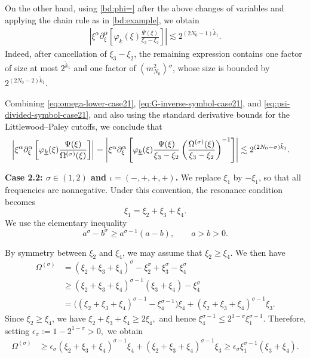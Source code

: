 \documentclass[UTF-8,reqno]{amsart}
\numberwithin{equation}{section}
\theoremstyle{definition}
\def\geq{\geqslant}
\def\leq{\leqslant}
\def\geq{\geqslant}
\def\leq{\leqslant}
\begin{document}
On the other hand, using \eqref{bd:phi=} after the above changes of
variables and applying the chain rule as in \eqref{bd:example}, we
obtain
\begin{align}
\left|
\xi^\alpha\partial_\xi^\alpha
\left[
\varphi_{\underline{k}}(\xi)
\frac{\Psi(\xi)}{\xi_3-\xi_2}
\right]
\right|
\lesssim
2^{(2N_0-1)\tilde{k}_1}.
\label{eq:psi-divided-symbol-case21}
\end{align}
Indeed, after cancellation of $\xi_3-\xi_2$, the remaining expression
contains one factor of size at most $2^{\tilde{k}_1}$ and one factor
of $(m_{N_0}^2)''$, whose size is bounded by
$2^{(2N_0-2)\tilde{k}_1}$.

Combining \eqref{eq:omega-lower-case21},
\eqref{eq:G-inverse-symbol-case21}, and
\eqref{eq:psi-divided-symbol-case21}, and also using the standard
derivative bounds for the Littlewood--Paley cutoffs, we conclude that
\begin{align}
\left|
\xi^\alpha\partial_\xi^\alpha
\left[
\varphi_{\underline{k}}(\xi)
\frac{\Psi(\xi)}{\Omega^{(\sigma)}(\xi)}
\right]
\right|
&=
\left|
\xi^\alpha\partial_\xi^\alpha
\left[
\varphi_{\underline{k}}(\xi)
\frac{\Psi(\xi)}{\xi_3-\xi_2}
\left(
\frac{\Omega^{(\sigma)}(\xi)}
     {\xi_3-\xi_2}
\right)^{-1}
\right]
\right| \lesssim
2^{(2N_0-\sigma)\tilde{k}_1}.\notag
\end{align}


\textbf{Case 2.2: $\sigma\in(1,2)$ and
$\iota=(-,+,+,+)$.}
We replace $\xi_1$ by $-\xi_1$, so that all frequencies are
nonnegative. Under this convention, the resonance condition becomes
\[
    \xi_1=\xi_2+\xi_3+\xi_4.
\]
We use the elementary inequality
\[
    a^\sigma-b^\sigma
    \geq a^{\sigma-1}(a-b),
    \qquad a>b>0.
\] 

By symmetry between $\xi_2$ and $\xi_4$, we may assume that
$\xi_2\geq\xi_4$. We then have
\begin{align*}
\Omega^{(\sigma)}
&=(\xi_2+\xi_3+\xi_4)^\sigma
  -\xi_2^\sigma+\xi_3^\sigma-\xi_4^\sigma
\\
&\geq
(\xi_2+\xi_3+\xi_4)^{\sigma-1}
(\xi_3+\xi_4)-\xi_4^\sigma
\\
&=
\Big(
(\xi_2+\xi_3+\xi_4)^{\sigma-1}
-\xi_4^{\sigma-1}
\Big)\xi_4
+
(\xi_2+\xi_3+\xi_4)^{\sigma-1}\xi_3.
\end{align*}
Since $\xi_2\geq\xi_4$, we have  
$
     \xi_2+\xi_3+\xi_4\geq2\xi_4,
$
and hence
$
    \xi_4^{\sigma-1}
    \leq
    2^{1-\sigma}\xi_1^{\sigma-1}.
$
Therefore, setting
$
    \epsilon_\sigma:=1-2^{1-\sigma}>0,
$
we obtain
\begin{align}
\Omega^{(\sigma)}
&\geq
\epsilon_\sigma
(\xi_2+\xi_3+\xi_4)^{\sigma-1}\xi_4
+
(\xi_2+\xi_3+\xi_4)^{\sigma-1}\xi_3 \geq
\epsilon_\sigma
\xi_1^{\sigma-1}(\xi_3+\xi_4).
\label{eq:omega-lower-case22}
\end{align}
\end{document}
